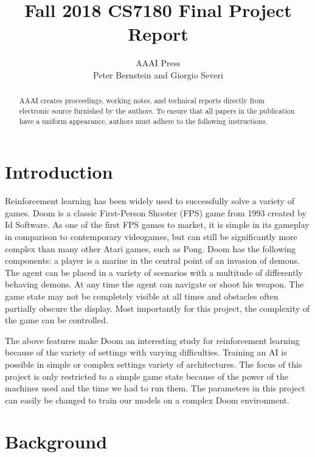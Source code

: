 \documentclass[letterpaper]{article} %
\begin{document}
%
\title{Fall 2018 CS7180 Final Project Report}
\author{AAAI Press\\
Peter Bernstein and Giorgio Severi
}
\maketitle
\begin{abstract}
AAAI creates proceedings, working notes, and technical reports directly from electronic source furnished by the authors. To ensure that all papers in the publication have a uniform appearance, authors must adhere to the following instructions. 
\end{abstract}

\section{Introduction}
Reinforcement learning has been widely used to successfully solve a variety of games. Doom is a classic First-Person Shooter (FPS) game from 1993 created by Id Software. As one of the first FPS games to market, it is simple in its gameplay in comparison to contemporary videogames, but can still be significantly more complex than many other Atari games, such as Pong. Doom has the following components: a player is a marine in the central point of an invasion of demons. The agent can be placed in a variety of scenarios with a multitude of differently behaving demons. At any time the agent can navigate or shoot his weapon. The game state may not be completely visible at all times and obstacles often partially obscure the display. Most importantly for this project, the complexity of the game can be controlled.

The above features make Doom an interesting study for reinforcement learning because of the variety of settings with varying difficulties. Training an AI is possible in simple or complex settings variety of architectures. The focus of this project is only restricted to a simple game state because of the power of the machines used and the time we had to run them. The parameters in this project can easily be changed to train our models on a complex Doom environment.

 

 




\section{Background}
\end{document}
